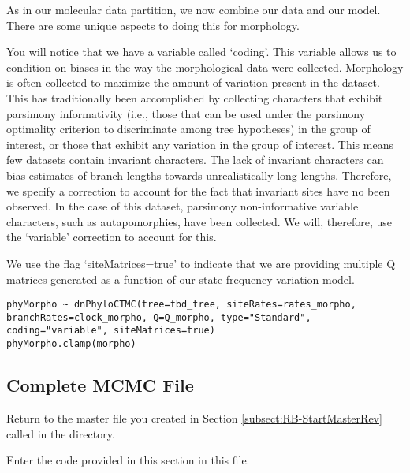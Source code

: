 As in our molecular data partition, we now combine our data and our model. There are some unique aspects to doing this for morphology. \par
You will notice that we have a variable called `coding'. This variable allows us to condition on biases in the way the morphological data were collected.
Morphology is often collected to maximize the amount of variation present in the dataset. 
This has traditionally been accomplished by collecting characters that exhibit parsimony informativity (i.e., those that can be used under the parsimony optimality criterion to discriminate among tree hypotheses) in the group of interest, or those that exhibit any variation in the group of interest. 
This means few datasets contain invariant characters. 
The lack of invariant characters can bias estimates of branch lengths towards unrealistically long lengths.
Therefore, we specify a correction to account for the fact that invariant sites have no been observed.
In the case of this dataset, parsimony non-informative variable characters, such as autapomorphies, have been collected. 
We will, therefore, use the `variable' correction to account for this. \par

We use the flag `siteMatrices=true' to indicate that we are providing multiple Q matrices generated as a function of our state frequency variation model. \par


{\tt \begin{snugshade*}
\begin{lstlisting}
phyMorpho ~ dnPhyloCTMC(tree=fbd_tree, siteRates=rates_morpho, branchRates=clock_morpho, Q=Q_morpho, type="Standard", coding="variable", siteMatrices=true)
phyMorpho.clamp(morpho)
\end{lstlisting}
\end{snugshade*}}


\bigskip

\subsection{Complete MCMC File}\label{subsect:RB-CompleteMCMC}

{\begin{framed}
Return to the master \Rev file you created in Section \ref{subsect:RB-StartMasterRev} called {\textcolor{red}{}} in the  directory.

Enter the \Rev code provided in this section in this file.
\end{framed}}

